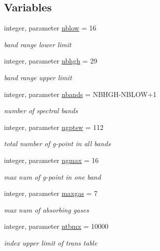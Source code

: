 \subsection*{Variables}
\begin{DoxyCompactItemize}
\item 
integer, parameter \hyperlink{group__module__radsw__main_ga2c5efc91f02dc0d4bdbd5e490f44c19c}{nblow} = 16
\begin{DoxyCompactList}\small\item\em band range lower limit \end{DoxyCompactList}\item 
integer, parameter \hyperlink{group__module__radsw__main_ga39e5ca4fd5defbc2545ee39bbf50d61b}{nbhgh} = 29
\begin{DoxyCompactList}\small\item\em band range upper limit \end{DoxyCompactList}\item 
integer, parameter \hyperlink{group__module__radsw__main_ga8f97b7698e8e5e2aec6e463fd09255cc}{nbands} = N\+B\+H\+GH-\/N\+B\+L\+OW+1
\begin{DoxyCompactList}\small\item\em number of spectral bands \end{DoxyCompactList}\item 
integer, parameter \hyperlink{group__module__radsw__main_gadc3e4d5a848d50e2883e05c62f61bc97}{ngptsw} = 112
\begin{DoxyCompactList}\small\item\em total number of g-\/point in all bands \end{DoxyCompactList}\item 
integer, parameter \hyperlink{group__module__radsw__main_ga0ba0ff5c18d3303a852d88687b4b5ca9}{ngmax} = 16
\begin{DoxyCompactList}\small\item\em max num of g-\/point in one band \end{DoxyCompactList}\item 
integer, parameter \hyperlink{group__module__radsw__main_ga5bc6fbb4231281a604352eec6b8e2bfc}{maxgas} = 7
\begin{DoxyCompactList}\small\item\em max num of absorbing gases \end{DoxyCompactList}\item 
integer, parameter \hyperlink{group__module__radsw__main_ga4bd72558be40bfccfb78c48e640acd07}{ntbmx} = 10000
\begin{DoxyCompactList}\small\item\em index upper limit of trans table \end{DoxyCompactList}\item 

\end{DoxyCompactItemize}
